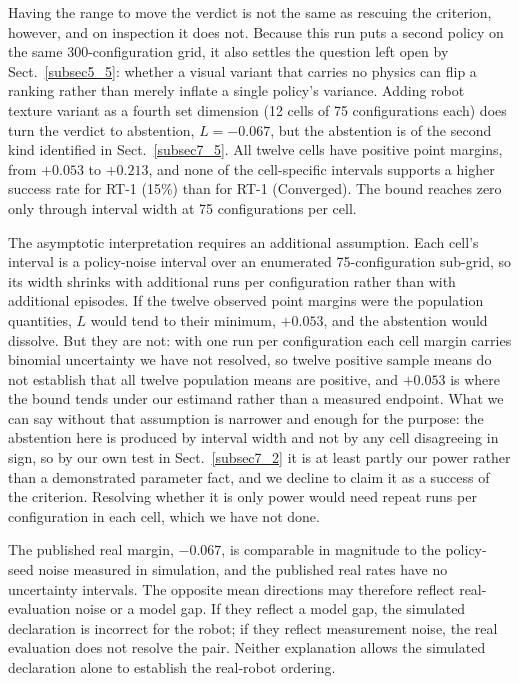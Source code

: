 \documentclass[pdflatex,iicol,sn-apa]{sn-jnl}
\theoremstyle{remark}
\begin{document}
Having the range to move the verdict is not the same as rescuing the criterion, however, and on
inspection it does not. Because this run puts a second policy on
the same 300-configuration grid, it also settles the question left open by Sect.~\ref{subsec5_5}:
whether a visual variant that carries no physics can flip a ranking rather than merely
inflate a single policy's variance. Adding robot texture variant as a fourth set dimension (12 cells
of 75 configurations each) does turn the verdict to abstention, $L = -0.067$, but the abstention
is of the second kind identified in Sect.~\ref{subsec7_5}. All twelve cells have positive
point margins, from $+0.053$ to $+0.213$, and none of the cell-specific intervals supports a higher success rate for RT-1 (15\%) than for RT-1 (Converged). The bound reaches zero only through interval width at
75 configurations per cell.

The asymptotic interpretation requires an additional assumption. Each cell's interval is a policy-noise interval over an enumerated 75-configuration sub-grid, so its
width shrinks with additional runs per configuration rather than with additional episodes. If
the twelve observed point margins were the population quantities, $L$ would tend to their minimum,
$+0.053$, and the abstention would dissolve. But they are not: with one run per configuration each
cell margin carries binomial uncertainty we have not resolved, so twelve positive sample
means do not establish that all twelve population means are positive, and $+0.053$ is where the
bound tends under our estimand rather than a measured endpoint. What we can say without that
assumption is narrower and enough for the purpose: the abstention here is produced by interval width
and not by any cell disagreeing in sign, so by our own test in Sect.~\ref{subsec7_2} it is at least
partly our power rather than a demonstrated parameter fact, and we decline to claim it as a success
of the criterion. Resolving whether it is only power would need repeat runs per configuration
in each cell, which we have not done.

The published real margin, $-0.067$, is comparable in magnitude to the policy-seed noise
measured in simulation, and the published real rates have no uncertainty intervals.
The opposite mean directions may therefore reflect real-evaluation noise or a model gap.
If they reflect a model gap, the simulated declaration is incorrect for the robot; if they
reflect measurement noise, the real evaluation does not resolve the pair. Neither explanation
allows the simulated declaration alone to establish the real-robot ordering.
\end{document}
